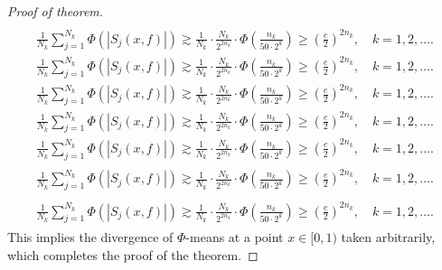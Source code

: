 \documentclass{amsart}
\numberwithin{equation}{section}
\begin{document}
\begin{proof}[Proof of theorem]
{\begin{align*}
\end{align*}\fi   
{}\begin{align}
\frac{1}{N_k}\sum_{j=1}^{N_k}\Phi(|S_j(x,f)|)\gtrsim\frac{1}{N_k}\cdot\frac{N_k}{2^{2n_k}}\cdot\Phi\left( \frac{n_k}{50\cdot  2^k }\right)\ge \left(\frac{e}{2}\right)^{2n_k},\quad k=1,2,\ldots.
\end{align}\fi    
{}\begin{gather*}
\frac{1}{N_k}\sum_{j=1}^{N_k}\Phi(|S_j(x,f)|)\gtrsim\frac{1}{N_k}\cdot\frac{N_k}{2^{2n_k}}\cdot\Phi\left( \frac{n_k}{50\cdot  2^k }\right)\ge \left(\frac{e}{2}\right)^{2n_k},\quad k=1,2,\ldots.
\end{gather*}\fi  
{}\begin{gather}
\frac{1}{N_k}\sum_{j=1}^{N_k}\Phi(|S_j(x,f)|)\gtrsim\frac{1}{N_k}\cdot\frac{N_k}{2^{2n_k}}\cdot\Phi\left( \frac{n_k}{50\cdot  2^k }\right)\ge \left(\frac{e}{2}\right)^{2n_k},\quad k=1,2,\ldots.
\end{gather}\fi   
{}\begin{multline*}
\frac{1}{N_k}\sum_{j=1}^{N_k}\Phi(|S_j(x,f)|)\gtrsim\frac{1}{N_k}\cdot\frac{N_k}{2^{2n_k}}\cdot\Phi\left( \frac{n_k}{50\cdot  2^k }\right)\ge \left(\frac{e}{2}\right)^{2n_k},\quad k=1,2,\ldots.
\end{multline*}\fi  
{}\begin{multline}
\frac{1}{N_k}\sum_{j=1}^{N_k}\Phi(|S_j(x,f)|)\gtrsim\frac{1}{N_k}\cdot\frac{N_k}{2^{2n_k}}\cdot\Phi\left( \frac{n_k}{50\cdot  2^k }\right)\ge \left(\frac{e}{2}\right)^{2n_k},\quad k=1,2,\ldots.
\end{multline}\fi  
{}\begin{multline*}\begin{split}
\frac{1}{N_k}\sum_{j=1}^{N_k}\Phi(|S_j(x,f)|)\gtrsim\frac{1}{N_k}\cdot\frac{N_k}{2^{2n_k}}\cdot\Phi\left( \frac{n_k}{50\cdot  2^k }\right)\ge \left(\frac{e}{2}\right)^{2n_k},\quad k=1,2,\ldots.
\end{split}\end{multline*}\fi
{}\begin{multline}\begin{split}
\frac{1}{N_k}\sum_{j=1}^{N_k}\Phi(|S_j(x,f)|)\gtrsim\frac{1}{N_k}\cdot\frac{N_k}{2^{2n_k}}\cdot\Phi\left( \frac{n_k}{50\cdot  2^k }\right)\ge \left(\frac{e}{2}\right)^{2n_k},\quad k=1,2,\ldots.
\end{split}\end{multline}\fi
}
This implies the divergence of  $\Phi$-means at a point  $x\in[0,1)$ taken arbitrarily, which completes the proof of the theorem.
\end{proof}
\end{document}
